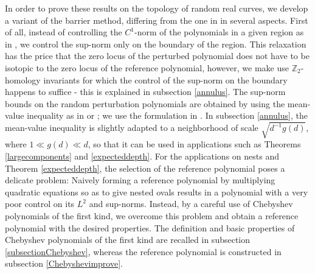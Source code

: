 \documentclass [11pt]{amsart}
\theoremstyle{remark}
\numberwithin{equation}{section}
\numberwithin{theorem}{section}
\begin{document}
In order to prove these results on the topology of random real curves, we develop a variant of the barrier method, differing from the one in \cite{GW2} in several aspects. First of all, instead of controlling the $C^{1}$-norm of the polynomials in a given region as in \cite{GW2}, we control the sup-norm only on the boundary of the region. This relaxation has the price that the zero locus of the perturbed polynomial does not have to be isotopic to the zero locus of the reference polynomial, however, we make use $\mathbb{Z}_{2}$-homology invariants for which the control of the sup-norm on the boundary happens to suffice - this is explained in subsection \ref{annulus}. The sup-norm bounds on the random perturbation polynomials are obtained by using the mean-value inequality as in \cite{NS} or \cite{GW2}; we use the formulation in \cite{KW}. In subsection \ref{annulus}, the mean-value inequality is slightly adapted to a neighborhood of scale $\displaystyle{\sqrt{d^{-1}g(d)}}$, where $1\ll g(d)\ll d$, so that it can be used in applications such as Theorems \ref{largecomponents} and   \ref{expecteddepth}. For the applications on nests and Theorem \ref{expecteddepth}, the selection of the reference polynomial poses a delicate problem: Naively forming a reference polynomial by multiplying quadratic equations so as to give nested ovals results in a polynomial with a very poor control on its $L^2$ and sup-norms. Instead, by a careful use of Chebyshev polynomials of the first kind, we overcome this problem and obtain a reference polynomial with the desired properties. The definition and basic properties of Chebyshev polynomials of the first kind are recalled in subsection \ref{subsectionChebyshev}, whereas the reference polynomial is constructed in subsection \ref{Chebyshevimprove}.  
 
\end{document}
